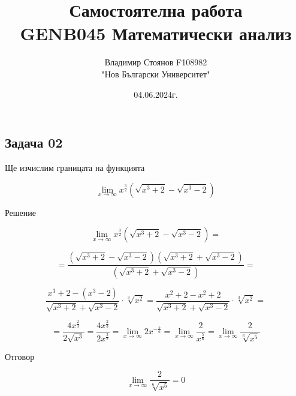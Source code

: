 \documentclass{article}
\title{\huge Самостоятелна работа \\ GENB045 Математически анализ}
\author{\LARGE Владимир Стоянов F108982 \\ \LARGE "Нов Български Университет"}
\date{\LARGE 04.06.2024г.}
\begin{document}
\maketitle

\Large
\begin{center}
    \section*{Задача 02}
\end{center}
\newpage
\begin{center}
    Ще изчислим границата на функцията
\end{center}
\[ \lim_{x\to\infty} x^{\frac{3}{2}}\left(\sqrt{x^3+2}-\sqrt{x^3-2}\right) \]

\vspace{0.5cm}
\begin{center}
    Решение
\end{center}
\[ \lim_{x\to\infty} x^{\frac{3}{2}}\left(\sqrt{x^3+2}-\sqrt{x^3-2}\right)= \]

\[ =\frac{\left(\sqrt{x^3+2}-\sqrt{x^3-2}\right)\left(\sqrt{x^3+2}+\sqrt{x^3-2}\right)}
{\left(\sqrt{x^3+2}+\sqrt{x^3-2}\right)}= \]

\[ \frac{x^3 + 2 - (x^3 - 2)}{\sqrt{x^3+2}+\sqrt{x^3-2}}\cdot\sqrt[3]{x^2}= \frac{x^2 + 2 - x^2 + 2}{\sqrt{x^3+2}+\sqrt{x^3-2}}\cdot\sqrt[3]{x^2}= \]

\[ =\frac{4x^\frac{2}{3}}{2\sqrt{x^3}} = \frac{4x^\frac{2}{3}}{2x^\frac{3}{2}} = \lim_{x\to\infty} 2x^{-\frac{5}{6}} = \lim_{x\to\infty} \frac{2}{x^\frac{5}{6}} = \lim_{x\to\infty} \frac{2}{\sqrt[6]{x^5}} \]

\vspace{1.5cm}
\begin{center}
    Отговор
\end{center}
\[ \lim_{x\to\infty} \frac{2}{\sqrt[6]{x^5}} = 0 \]
\end{document}
